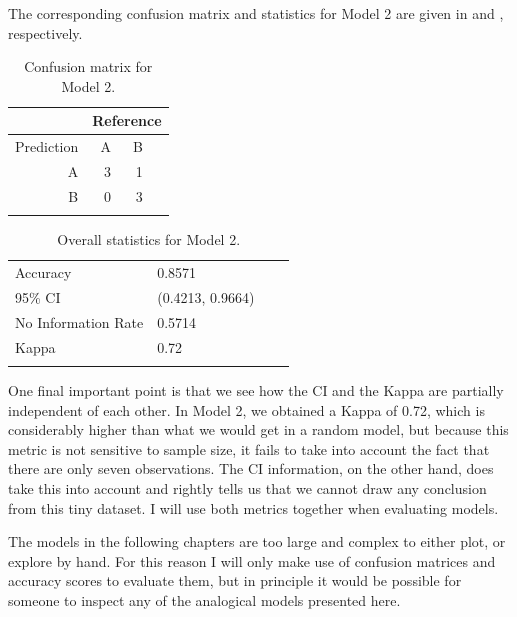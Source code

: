 The corresponding confusion matrix and statistics for Model 2 are given in  and , respectively.

\begin{table}[!htpb]
  \centering
  \begin{tabular}{rrrr}
    \lsptoprule
               & \multicolumn{3}{c}{Reference} \\
    \midrule
    Prediction & A  & B                        \\
    A          & 3  & 1                        \\
    B          & 0  & 3                        \\
    \lspbottomrule
  \end{tabular}
  \caption{Confusion matrix for Model 2.}\label{tab:model2-conf}
\end{table}

\begin{table}[!htpb]
  \centering
  \begin{tabular}{llrr}
    \lsptoprule
    \multicolumn{2}{c}{Overall statistics:} \\

    \midrule
    Accuracy            & 0.8571            \\
    95\% CI             & (0.4213, 0.9664)  \\
    No Information Rate & 0.5714            \\
    Kappa               & 0.72              \\
    \lspbottomrule
  \end{tabular}
  \caption{Overall statistics for Model 2.}\label{tab:stats-model2}
\end{table}

\newpage 
One final important point is that we see how the CI and the Kappa are partially independent of each other. In Model 2, we obtained a Kappa of 0.72, which is considerably higher than what we would get in a random model, but because this metric is not sensitive to sample size, it fails to take into account the fact that there are only seven observations. The CI information, on the other hand, does take this into account and rightly tells us that we cannot draw any conclusion from this tiny dataset. I will use both metrics together when evaluating models.

The models in the following chapters are too large and complex to either plot, or explore by hand. For this reason I will only make use of confusion matrices and accuracy scores to evaluate them, but in principle it would be possible for someone to inspect any of the analogical models presented here.


